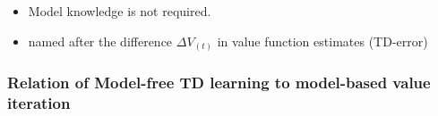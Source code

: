 \begin{frame}
{	\begin{itemize}
	
	\item  Model knowledge is not required.
	
	\item {} named after the difference $\Delta V_{(t)}$ in value function estimates (TD-error)
	
	\end{itemize}
	}
	
\end{frame}

\subsubsection{Relation of Model-free TD learning to model-based value iteration}


